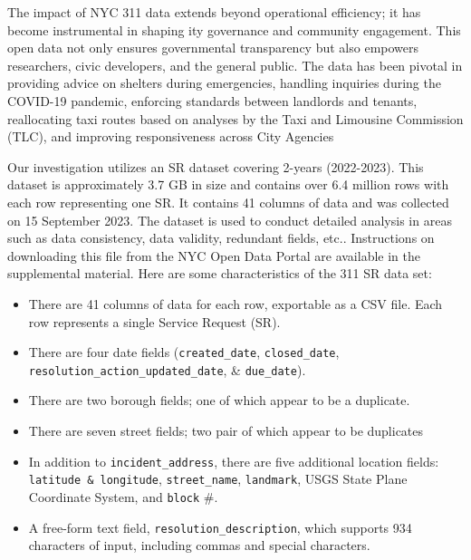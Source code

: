 \documentclass[linenumber]{jdsart}
\begin{document}
The impact of NYC 311 data extends beyond operational efficiency; it
has become instrumental in shaping ity governance and community
engagement. This open data not only ensures governmental transparency
but also empowers researchers, civic developers, and the general
public. The data has been pivotal in providing advice on shelters
during emergencies, handling inquiries during the COVID\mbox{-}19 pandemic,
enforcing standards between landlords and tenants, reallocating taxi
routes based on analyses by the Taxi and Limousine Commission (TLC),
and improving responsiveness across City Agencies


Our investigation utilizes an SR dataset covering  2\mbox{-}years (2022-2023).
This dataset is approximately 3.7 GB in size and contains over 
6.4 million rows with each row representing one SR. It contains 
41 columns of data and was collected on 15 September 2023. The 
dataset is used to conduct detailed analysis 
in areas such as data consistency, data validity, redundant fields, 
etc.. Instructions on downloading this file from the 
NYC Open Data Portal are available in the supplemental material.
Here are some characteristics of the 311 SR data set:

\begin{itemize}[left=1.5em]
	\item There are 41 columns of data for each row, exportable as a CSV file.
	Each row represents a single Service Request (SR). 
	
	\item There are four date fields 
	(\texttt{created\_date}, \texttt{closed\_date}, \texttt{resolution\_action\_updated\_date}, \& \texttt{due\_date}).
	
	\item There are two borough fields; one of which appear to be a duplicate.
		
	\item There are seven street fields; two pair of which appear to be duplicates
	
	\item In addition to  \texttt{incident\_address}, there are five additional location fields: 
	\texttt{latitude \& longitude}, \texttt{street\_name}, \texttt{landmark}, USGS State Plane 
	Coordinate System, and \texttt{block} \#.
	
	\item A free\mbox{-}form text field, \texttt{resolution\_description}, which 
	supports 934 characters of input, including commas and special characters.
\end{itemize}
\end{document}
